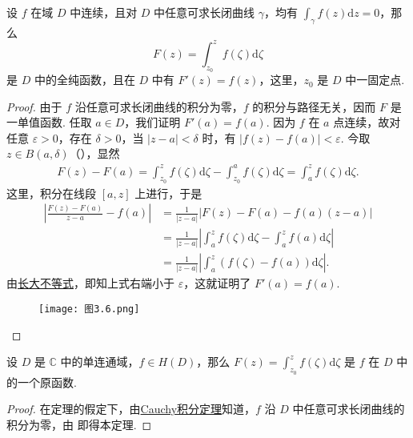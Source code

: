 \documentclass[../../main.tex]{subfiles}
\begin{document}
\begin{theorem}\label{theorem:定理3.3.2}
设 \( f \) 在域 \( D \) 中连续，且对 \( D \) 中任意可求长闭曲线 \( \gamma \)，均有 \( \int_{\gamma} f(z) \mathrm{d}z  = 0 \)，那么
\[
F(z) = \int_{z_0}^{z} f(\zeta) \mathrm{d}\zeta 
\]
是 \( D \) 中的全纯函数，且在 \( D \) 中有 \( F'(z) = f(z) \)，这里，\( z_0 \) 是 \( D \) 中一固定点.
\end{theorem}
\begin{proof}
由于 \( f \) 沿任意可求长闭曲线的积分为零，\( f \) 的积分与路径无关，因而 \( F \) 是一单值函数. 任取 \( a \in D \)，我们证明 \( F'(a) = f(a) \). 因为 \( f \) 在 \( a \) 点连续，故对任意 \( \varepsilon > 0 \)，存在 \( \delta > 0 \)，当 \( |z - a| < \delta \) 时，有 \( |f(z) - f(a)| < \varepsilon \). 今取 \( z \in B(a, \delta) \)（），显然
\begin{align*}
F(z) - F(a) = \int_{z_0}^{z} f(\zeta) \mathrm{d}\zeta  - \int_{z_0}^{a} f(\zeta) \mathrm{d}\zeta  = \int_{a}^{z} f(\zeta) \mathrm{d}\zeta .
\end{align*}
这里，积分在线段 \( [a, z] \) 上进行，于是
\begin{align*}
\left| \frac{F(z) - F(a)}{z - a} - f(a) \right| 
&= \frac{1}{|z - a|} \left| F(z) - F(a) - f(a)(z - a) \right| \\
&= \frac{1}{|z - a|} \left| \int_{a}^{z} f(\zeta) \mathrm{d}\zeta  - \int_{a}^{z} f(a) \mathrm{d}\zeta  \right| \\
&= \frac{1}{|z - a|} \left| \int_{a}^{z} (f(\zeta) - f(a)) \mathrm{d}\zeta  \right|.
\end{align*}
由\hyperref[proposition:长大不等式]{长大不等式}，即知上式右端小于 \( \varepsilon \)，这就证明了 \( F'(a) = f(a) \).
\begin{figure}[H]
\centering
\texttt{[image: 图3.6.png]}
\caption{}
\label{figure:图3.6}
\end{figure}

\end{proof}

\begin{theorem}\label{theorem:定理3.3.3}
设 \( D \) 是 \( \mathbb{C} \) 中的单连通域，\( f \in H(D) \)，那么 \( F(z) = \int_{z_0}^{z} f(\zeta) \mathrm{d}\zeta  \) 是 \( f \) 在 \( D \) 中的一个原函数.
\end{theorem}
\begin{proof}
在定理的假定下，由\hyperref[theorem:Cauchy-Goursat定理(Cauchy积分定理)]{Cauchy积分定理}知道，\( f \) 沿 \( D \) 中任意可求长闭曲线的积分为零，由 即得本定理.

\end{proof}
\end{document}
